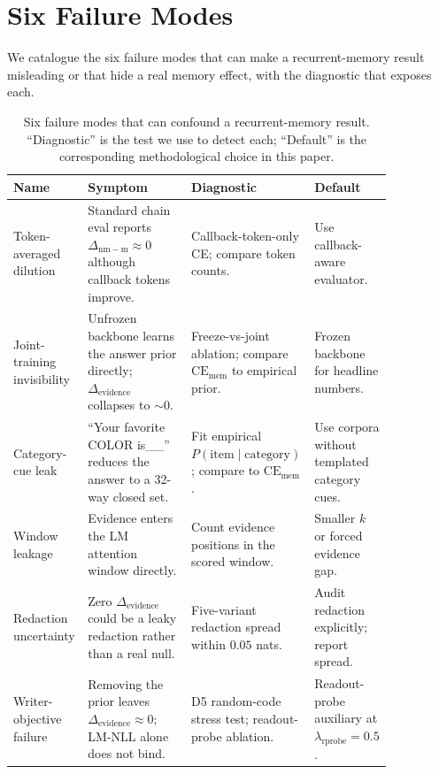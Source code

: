 \documentclass[11pt]{article}
\newcommand{\dnm}{\Delta_{\mathrm{nm{-}m}}}
\newcommand{\CEmem}{\mathrm{CE}_{\mathrm{mem}}}
\newcommand{\elift}{\Delta_{\mathrm{evidence}}}
\begin{document}
\section{Six Failure Modes}
\label{sec:failure}

We catalogue the six failure modes that can make a recurrent-memory
result misleading or that hide a real memory effect, with the
diagnostic that exposes each.

\begin{table}[t]
\centering
\small
\caption{Six failure modes that can confound a recurrent-memory
result. ``Diagnostic'' is the test we use to detect each; ``Default''
is the corresponding methodological choice in this paper.}
\label{tab:failure_modes}
\begin{tabular}{p{0.16\linewidth}p{0.27\linewidth}p{0.25\linewidth}p{0.17\linewidth}}
\toprule
Name & Symptom & Diagnostic & Default \\
\midrule
Token-averaged dilution
  & Standard chain eval reports $\dnm \approx 0$ although callback tokens improve.
  & Callback-token-only CE; compare token counts.
  & Use callback-aware evaluator. \\
\midrule
Joint-training invisibility
  & Unfrozen backbone learns the answer prior directly; $\elift$ collapses to $\sim 0$.
  & Freeze-vs-joint ablation; compare $\CEmem$ to empirical prior.
  & Frozen backbone for headline numbers. \\
\midrule
Category-cue leak
  & ``Your favorite COLOR is\_\_'' reduces the answer to a 32-way closed set.
  & Fit empirical $P(\mathrm{item}\mid\mathrm{category})$; compare to $\CEmem$.
  & Use corpora without templated category cues. \\
\midrule
Window leakage
  & Evidence enters the LM attention window directly.
  & Count evidence positions in the scored window.
  & Smaller $k$ or forced evidence gap. \\
\midrule
Redaction uncertainty
  & Zero $\elift$ could be a leaky redaction rather than a real null.
  & Five-variant redaction spread within $0.05$ nats.
  & Audit redaction explicitly; report spread. \\
\midrule
Writer-objective failure
  & Removing the prior leaves $\elift \approx 0$; LM-NLL alone does not bind.
  & D5 random-code stress test; readout-probe ablation.
  & Readout-probe auxiliary at $\lambda_{\mathrm{rprobe}}=0.5$. \\
\bottomrule
\end{tabular}
\end{table}
\end{document}
